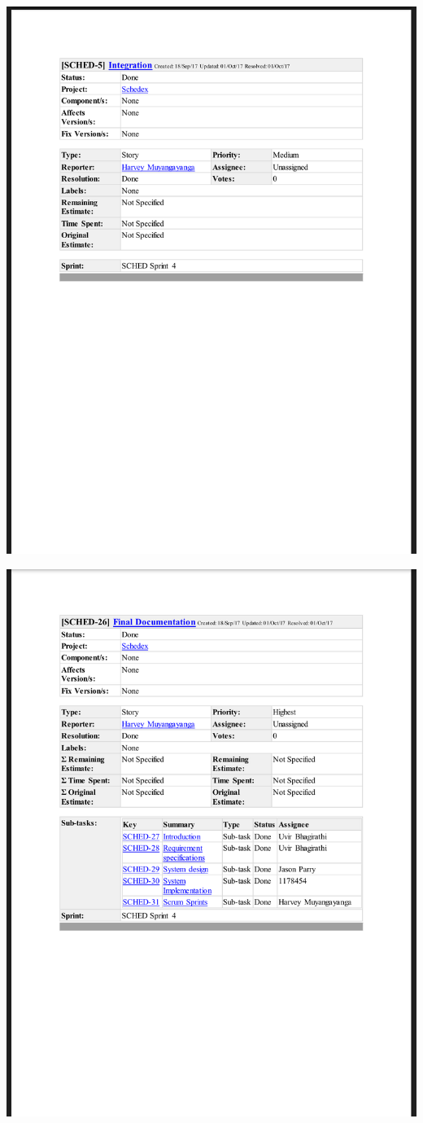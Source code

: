 \documentclass{article}
\begin{document}
\centerline{\includegraphics[scale=0.4]{sprint4_6}}

\centerline{\includegraphics[scale=0.4]{sprint4_7}}
\end{document}
